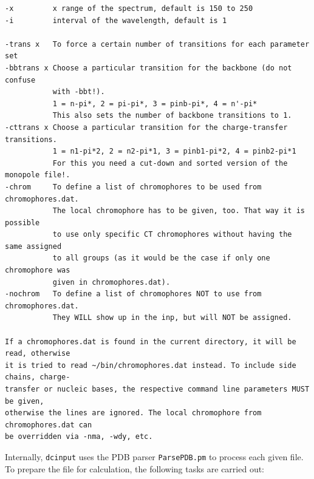 \documentclass[11pt, letterpaper]{article}
\begin{document}
{\begin{verbatim}
-x         x range of the spectrum, default is 150 to 250
-i         interval of the wavelength, default is 1

-trans x   To force a certain number of transitions for each parameter set
-bbtrans x Choose a particular transition for the backbone (do not confuse
           with -bbt!).
           1 = n-pi*, 2 = pi-pi*, 3 = pinb-pi*, 4 = n'-pi*
           This also sets the number of backbone transitions to 1.
-cttrans x Choose a particular transition for the charge-transfer transitions.
           1 = n1-pi*2, 2 = n2-pi*1, 3 = pinb1-pi*2, 4 = pinb2-pi*1
           For this you need a cut-down and sorted version of the monopole file!.
-chrom     To define a list of chromophores to be used from chromophores.dat.
           The local chromophore has to be given, too. That way it is possible
           to use only specific CT chromophores without having the same assigned
           to all groups (as it would be the case if only one chromophore was
           given in chromophores.dat).
-nochrom   To define a list of chromophores NOT to use from chromophores.dat.
           They WILL show up in the inp, but will NOT be assigned.

If a chromophores.dat is found in the current directory, it will be read, otherwise
it is tried to read ~/bin/chromophores.dat instead. To include side chains, charge-
transfer or nucleic bases, the respective command line parameters MUST be given,
otherwise the lines are ignored. The local chromophore from chromophores.dat can
be overridden via -nma, -wdy, etc.
\end{verbatim}
} %

\newpage

Internally, \verb'dcinput' uses the PDB parser \verb'ParsePDB.pm'\cite{Bulheller:09:539} to process each given file. To prepare the file for calculation, the following tasks are carried out:
\end{document}
